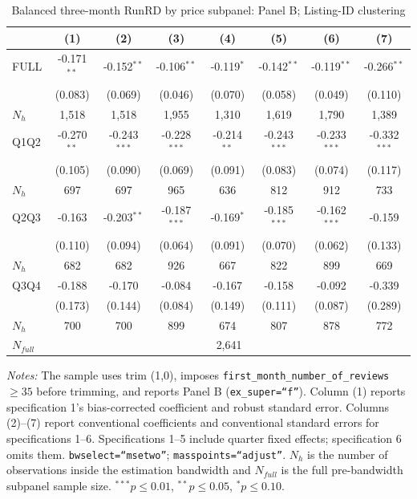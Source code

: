 \begin{table}[!htbp]
\centering
\caption{Balanced three-month RunRD by price subpanel: Panel B; Listing-ID clustering}
\scriptsize
\setlength{\tabcolsep}{5pt}
\begin{tabular}{l*{7}{c}}
\toprule
 & (1) & (2) & (3) & (4) & (5) & (6) & (7) \\
\midrule
FULL & -0.171$^{**}$ & -0.152$^{**}$ & -0.106$^{**}$ & -0.119$^{*}$ & -0.142$^{**}$ & -0.119$^{**}$ & -0.266$^{**}$ \\
 & (0.083) & (0.069) & (0.046) & (0.070) & (0.058) & (0.049) & (0.110) \\
$N_h$ & 1,518 & 1,518 & 1,955 & 1,310 & 1,619 & 1,790 & 1,389 \\
\addlinespace
Q1Q2 & -0.270$^{**}$ & -0.243$^{***}$ & -0.228$^{***}$ & -0.214$^{**}$ & -0.243$^{***}$ & -0.233$^{***}$ & -0.332$^{***}$ \\
 & (0.105) & (0.090) & (0.069) & (0.091) & (0.083) & (0.074) & (0.117) \\
$N_h$ & 697 & 697 & 965 & 636 & 812 & 912 & 733 \\
\addlinespace
Q2Q3 & -0.163 & -0.203$^{**}$ & -0.187$^{***}$ & -0.169$^{*}$ & -0.185$^{***}$ & -0.162$^{***}$ & -0.159 \\
 & (0.110) & (0.094) & (0.064) & (0.091) & (0.070) & (0.062) & (0.133) \\
$N_h$ & 682 & 682 & 926 & 667 & 822 & 899 & 669 \\
\addlinespace
Q3Q4 & -0.188 & -0.170 & -0.084 & -0.167 & -0.158 & -0.092 & -0.339 \\
 & (0.173) & (0.144) & (0.084) & (0.149) & (0.111) & (0.087) & (0.289) \\
$N_h$ & 700 & 700 & 899 & 674 & 807 & 878 & 772 \\

\midrule
$N_{full}$ & \multicolumn{7}{c}{2,641} \\
\bottomrule
\end{tabular}
\begin{minipage}{0.98\textwidth}
\footnotesize
\textit{Notes:} The sample uses trim (1,0), imposes \texttt{first\_month\_number\_of\_reviews}$\geq35$ before trimming, and reports Panel B (\texttt{ex\_super=``f''}). Column (1) reports specification 1's bias-corrected coefficient and robust standard error. Columns (2)--(7) report conventional coefficients and conventional standard errors for specifications 1--6. Specifications 1--5 include quarter fixed effects; specification 6 omits them. \texttt{bwselect=``msetwo''}; \texttt{masspoints=``adjust''}. $N_h$ is the number of observations inside the estimation bandwidth and $N_{full}$ is the full pre-bandwidth subpanel sample size. $^{***}p\leq0.01$, $^{**}p\leq0.05$, $^{*}p\leq0.10$.
\end{minipage}
\end{table}
\clearpage
